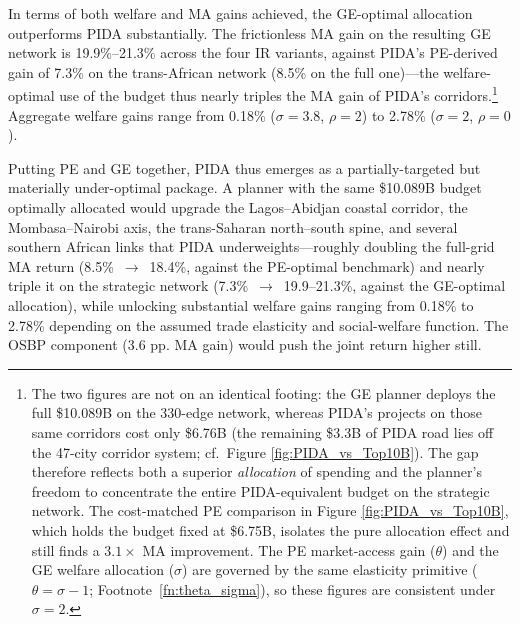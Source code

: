 \documentclass[a4paper]{article}
\begin{document}
In terms of both welfare and MA gains achieved, the GE-optimal allocation outperforms PIDA substantially. The frictionless MA gain on the resulting GE network is 19.9\%--21.3\% across the four IR variants, against PIDA's PE-derived gain of 7.3\% on the trans-African network (8.5\% on the full one)---the welfare-optimal use of the budget thus nearly triples the MA gain of PIDA's corridors.\footnote{The two figures are not on an identical footing: the GE planner deploys the full \$10.089B on the 330-edge network, whereas PIDA's projects on those same corridors cost only \$6.76B (the remaining \$3.3B of PIDA road lies off the 47-city corridor system; cf.\ Figure \ref{fig:PIDA_vs_Top10B}). The gap therefore reflects both a superior \textit{allocation} of spending and the planner's freedom to concentrate the entire PIDA-equivalent budget on the strategic network. The cost-matched PE comparison in Figure \ref{fig:PIDA_vs_Top10B}, which holds the budget fixed at \$6.75B, isolates the pure allocation effect and still finds a $3.1\times$ MA improvement. The PE market-access gain ($\theta$) and the GE welfare allocation ($\sigma$) are governed by the same elasticity primitive ($\theta = \sigma - 1$; Footnote~\ref{fn:theta_sigma}), so these figures are consistent under $\sigma = 2$.} Aggregate welfare gains range from 0.18\% ($\sigma = 3.8$, $\rho = 2$) to 2.78\% ($\sigma = 2$, $\rho = 0$). \newline %

Putting PE and GE together, PIDA thus emerges as a partially-targeted but materially under-optimal package. A planner with the same \$10.089B budget optimally allocated would upgrade the Lagos--Abidjan coastal corridor, the Mombasa--Nairobi axis, the trans-Saharan north--south spine, and several southern African links that PIDA underweights---roughly doubling the full-grid MA return (8.5\%~$\to$~18.4\%, against the PE-optimal benchmark) and nearly triple it on the strategic network (7.3\%~$\to$~19.9--21.3\%, against the GE-optimal allocation), while unlocking substantial welfare gains ranging from 0.18\% to 2.78\% depending on the assumed trade elasticity and social-welfare function. The OSBP component (3.6 pp. MA gain) would push the joint return higher still. \newline
\end{document}
